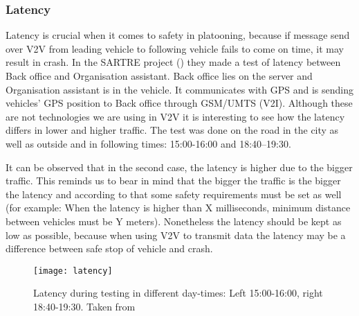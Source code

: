 \subsubsection{Latency}
Latency is crucial when it comes to safety in platooning, because if message send over V2V from leading vehicle to following vehicle fails to come on time, it may result in crash. In the SARTRE project (\cite{Chan2012ProjectSARTRE}) they made a test of latency between Back office and Organisation assistant. Back office lies on the server and Organisation assistant is in the vehicle. It communicates with GPS and is sending vehicles’ GPS position to Back office through GSM/UMTS (V2I). Although these are not technologies we are using in V2V it is interesting to see how the latency differs in lower and higher traffic. The test was done on the road in the city as well as outside and in following times: 15:00-16:00 and 18:40–19:30.\par
% 
It can be observed that in the second case, the latency is higher due to the bigger traffic. This reminds us to bear in mind that the bigger the traffic is the bigger the latency and according to that some safety requirements must be set as well (for example: When the latency is higher than X milliseconds, minimum distance between vehicles must be Y meters). Nonetheless the latency should be kept as low as possible, because when using V2V to transmit data the latency may be a difference between safe stop of vehicle and crash.
% 
\begin{figure}[p]
    \centering
    \texttt{[image: latency]}
    \caption{Latency during testing in different day-times: Left 15:00-16:00, right 18:40-19:30. Taken from \cite[p. 24]{Chan2012ProjectSARTRE}}
    \label{fig:latency}
\end{figure}
% 